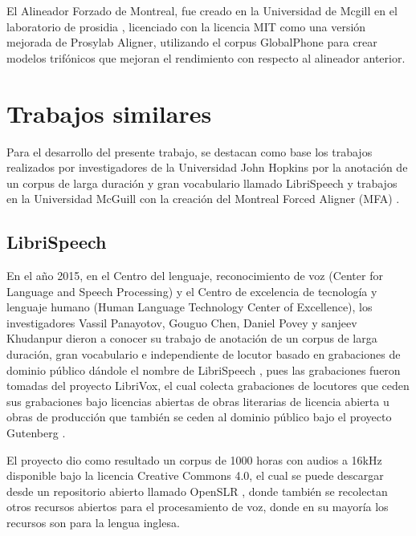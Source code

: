 El Alineador Forzado de Montreal, fue creado en la Universidad de Mcgill en el laboratorio de prosidia \cite{McAuliffe2017MontrealKaldi}, licenciado con la licencia MIT  como una versión mejorada de Prosylab Aligner, utilizando el corpus GlobalPhone  para crear modelos trifónicos que mejoran el rendimiento con respecto al alineador anterior.

\section{Trabajos similares}

Para el desarrollo del presente trabajo, se destacan como base los trabajos realizados por investigadores de la Universidad John Hopkins por la anotación de un corpus de larga duración y gran vocabulario llamado LibriSpeech \cite{PanayotovLIBRISPEECH:BOOKS} y trabajos en la Universidad McGuill con la creación del Montreal Forced Aligner (MFA) \cite{McAuliffe2017MontrealKaldi}.

\subsection{LibriSpeech}


En el año 2015, en el Centro del lenguaje, reconocimiento de voz (Center for Language and Speech Processing) y el Centro de excelencia de tecnología y lenguaje humano (Human Language Technology Center of Excellence), los investigadores Vassil Panayotov, Gouguo Chen, Daniel Povey y sanjeev Khudanpur dieron a conocer su trabajo de anotación de un corpus de larga duración, gran vocabulario e independiente de locutor basado en grabaciones de dominio público dándole el nombre de LibriSpeech \cite{PanayotovLIBRISPEECH:BOOKS}, pues las grabaciones fueron tomadas del proyecto LibriVox, el cual colecta grabaciones de locutores que ceden sus grabaciones bajo licencias abiertas de obras literarias de licencia abierta u obras de producción que también se ceden al dominio público bajo el proyecto Gutenberg \cite{gutenberg}.

El proyecto dio como resultado un corpus de 1000 horas con audios a 16kHz disponible bajo la licencia Creative Commons 4.0, el cual se puede descargar desde un repositorio abierto llamado OpenSLR \cite{openSLR}, donde también se recolectan otros recursos abiertos para el procesamiento de voz, donde en su mayoría los recursos son para la lengua inglesa.

